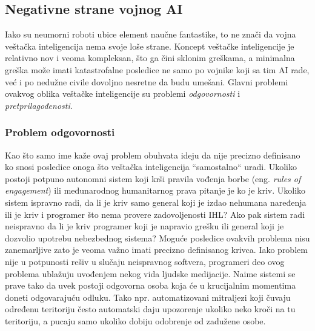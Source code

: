 \documentclass[a4paper]{article}
\begin{document}
\subsection{Negativne strane vojnog AI}
\label{subsec: Negativne strane vojnog AI}
Iako su neumorni roboti ubice element naučne fantastike, to ne znači da vojna veštačka inteligencija nema svoje loše strane. Koncept veštačke inteligencije je relativno nov i veoma kompleksan, što ga čini sklonim greškama, a minimalna greška može imati katastrofalne posledice ne samo po vojnike koji sa tim AI rade, već i po nedužne civile dovoljno nesretne da budu umešani. Glavni problemi ovakvog oblika veštačke inteligencije su problemi \emph{odgovornosti} i \emph{pretprilagođenosti}. 

\subsubsection{Problem odgovornosti}
\label{subsubsec: Problem odgovornosti}
Kao što samo ime kaže ovaj problem obuhvata ideju da nije precizno definisano ko snosi posledice onoga što veštačka inteligencija ``samostalno`` uradi.  Ukoliko postoji potpuno autonomni sistem koji krši pravila vođenja borbe (eng. \emph{rules of engagement}) ili međunarodnog humanitarnog prava pitanje je ko je kriv. Ukoliko sistem ispravno radi, da li je kriv samo general koji je izdao nehumana naređenja ili je kriv i programer što nema provere zadovoljenosti IHL? Ako pak sistem radi neispravno da li je kriv programer koji je napravio grešku ili general koji je dozvolio upotrebu nebezbednog sistema? Moguće posledice ovakvih problema nisu zanemarljive zato je veoma važno imati precizno definisanog krivca.
\newline
\newline
Iako problem nije u potpunosti rešiv u slučaju neispravnog softvera, programeri deo ovog problema ublažuju uvođenjem nekog vida ljudske medijacije. Naime sistemi se prave tako da uvek postoji odgovorna osoba koja će u krucijalnim momentima doneti odgovarajuću odluku. Tako npr. automatizovani mitraljezi koji čuvaju određenu teritoriju često automatski daju upozorenje ukoliko neko kroči na tu teritoriju, a pucaju samo ukoliko dobiju odobrenje od zadužene osobe.
\end{document}

